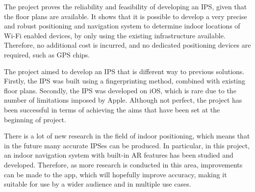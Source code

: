 The project proves the reliability and feasibility of developing an IPS, given that the floor plans are available. It shows that it is possible to develop a very precise and robust positioning and navigation system to determine indoor locations of Wi-Fi enabled devices, by only using the existing infrastructure available. Therefore, no additional cost is incurred, and no dedicated positioning devices are required, such as GPS chips.

The project aimed to develop an IPS that is different way to previous solutions. Firstly, the IPS was built using a fingerprinting method, combined with existing floor plans. Secondly, the IPS was developed on iOS, which is rare due to the number of limitations imposed by Apple. Although not perfect, the project has been successful in terms of achieving the aims that have been set at the beginning of project. 

There is a lot of new research in the field of indoor positioning, which means that in the future many accurate IPSes can be produced. In particular, in this project, an indoor navigation system with built-in AR features has been studied and developed. Therefore, as more research is conducted in this area, improvements can be made to the app, which will hopefully improve accuracy, making it suitable for use by a wider audience and in multiple use cases.
